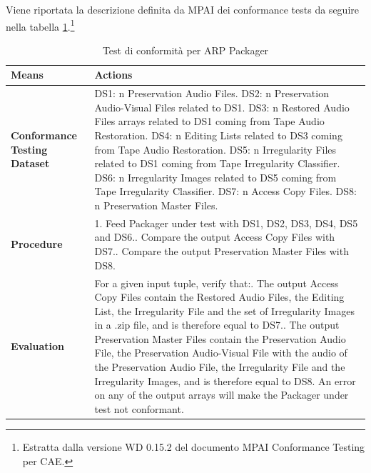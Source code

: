 Viene riportata la descrizione definita da \ac{MPAI} dei conformance tests da seguire nella tabella \ref{tab:packager-valutazione}.\footnote{Estratta dalla versione WD 0.15.2 del documento MPAI Conformance Testing per \ac{CAE}.} 
\begin{table}[H]
    \centering
    \begin{tabular}{|p{}|p{}|}
        \hline
        \textbf{Means}   &   \textbf{Actions}\\
        \hline
        \textbf{Conformance Testing Dataset}    &
            DS1: n Preservation Audio Files.\newline
            DS2: n Preservation Audio-Visual Files related to DS1.\newline
            DS3: n Restored Audio Files arrays related to DS1 coming from Tape Audio Restoration.\newline
            DS4: n Editing Lists related to DS3 coming from Tape Audio Restoration.\newline
            DS5: n Irregularity Files related to DS1 coming from Tape Irregularity Classifier.\newline
            DS6: n Irregularity Images related to DS5 coming from Tape Irregularity Classifier.\newline
            DS7: n Access Copy Files.\newline
            DS8: n Preservation Master Files.\\
        \hline
        \textbf{Procedure}  &
            1.	Feed Packager under test with DS1, DS2, DS3, DS4, DS5 and DS6.\newline
            2.	Compare the output Access Copy Files with DS7.\newline
            3.	Compare the output Preservation Master Files with DS8.\\
        \hline
        \textbf{Evaluation} &
            For a given input tuple, verify that:\newline
                1.	The output Access Copy Files contain the Restored Audio Files, the Editing List, the Irregularity File and the set of Irregularity Images in a .zip file, and is therefore equal to DS7.\newline
                2.	The output Preservation Master Files contain the Preservation Audio File, the Preservation Audio-Visual File with the audio of the Preservation Audio File, the Irregularity File and the Irregularity Images, and is therefore equal to DS8.\newline
            An error on any of the output arrays will make the Packager under test not conformant.\\
        \hline
    \end{tabular}
    \caption{Test di conformità per \ac{ARP} Packager}
    \label{tab:packager-valutazione}
\end{table}

